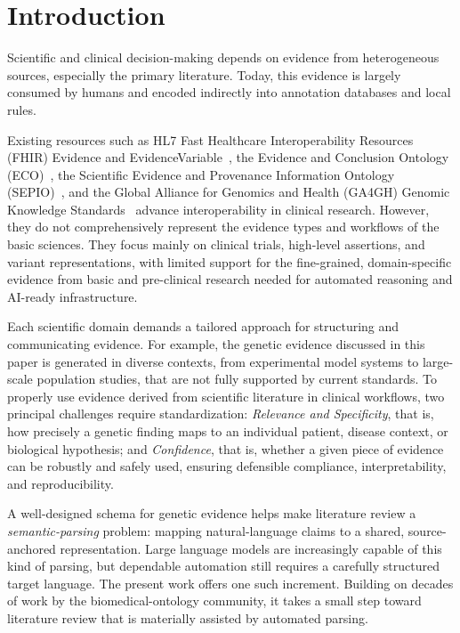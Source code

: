 %

\section{Introduction}
\label{sec:intro}

Scientific and clinical decision-making depends on evidence from
heterogeneous sources, especially the primary literature. Today,
this evidence is largely consumed by humans and encoded indirectly
into annotation databases and local rules.

Existing resources such as HL7 Fast Healthcare Interoperability
Resources (FHIR) Evidence and EvidenceVariable~\cite{fhir_evidence},
the Evidence and Conclusion Ontology (ECO)~\cite{eco2019}, the
Scientific Evidence and Provenance Information Ontology
(SEPIO)~\cite{sepio}, and the Global Alliance for Genomics and
Health (GA4GH) Genomic Knowledge Standards~\cite{ga4gh_va}
advance interoperability in clinical research. However, they do not
comprehensively represent the evidence types and workflows of the
basic sciences. They focus mainly on clinical trials, high-level
assertions, and variant representations, with limited support for the
fine-grained, domain-specific evidence from basic and pre-clinical
research needed for automated reasoning and AI-ready infrastructure.

Each scientific domain demands a tailored approach for structuring
and communicating evidence. For example, the genetic evidence
discussed in this paper is generated in diverse contexts, from
experimental model systems to large-scale population studies, that
are not fully supported by current standards.
To properly use evidence derived from
scientific literature in clinical workflows, two principal challenges
require standardization: \emph{Relevance and Specificity}, that is,
how precisely a genetic finding maps to an individual patient,
disease context, or biological hypothesis; and \emph{Confidence},
that is, whether a given piece of evidence can be robustly and
safely used, ensuring defensible compliance, interpretability, and
reproducibility.

A well-designed schema for genetic evidence helps make literature
review a \emph{semantic-parsing} problem: mapping natural-language
claims to a shared, source-anchored representation. Large language
models are increasingly capable of this kind of parsing, but
dependable automation still requires a carefully structured target
language. The present work offers one such increment. Building on decades of work by
the biomedical-ontology community, it takes a small step toward literature
review that is materially assisted by automated parsing.

